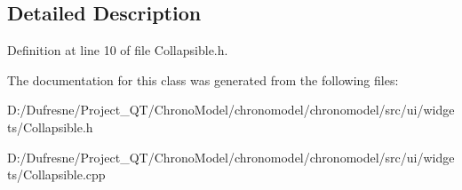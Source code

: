 \subsection{Detailed Description}


Definition at line 10 of file Collapsible.\-h.



The documentation for this class was generated from the following files\-:\begin{DoxyCompactItemize}
\item 
D\-:/\-Dufresne/\-Project\-\_\-\-Q\-T/\-Chrono\-Model/chronomodel/chronomodel/src/ui/widgets/Collapsible.\-h\item 
D\-:/\-Dufresne/\-Project\-\_\-\-Q\-T/\-Chrono\-Model/chronomodel/chronomodel/src/ui/widgets/Collapsible.\-cpp\end{DoxyCompactItemize}

